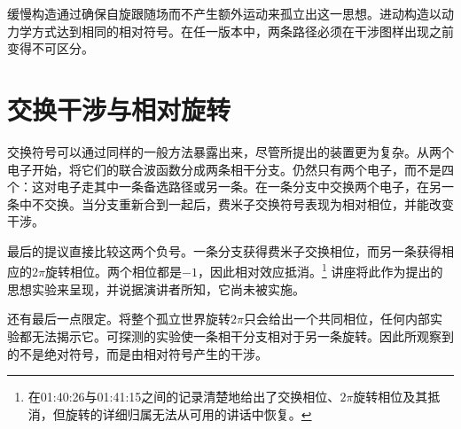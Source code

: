 \begin{classroomqa}
\end{classroomqa}

缓慢构造通过确保自旋跟随场而不产生额外运动来孤立出这一思想。进动构造以动力学方式达到相同的相对符号。在任一版本中，两条路径必须在干涉图样出现之前变得不可区分。

\begin{classroomqa}
\end{classroomqa}

\begin{classroomqa}
\end{classroomqa}

\section{交换干涉与相对旋转}

交换符号可以通过同样的一般方法暴露出来，尽管所提出的装置更为复杂。从两个电子开始，将它们的联合波函数分成两条相干分支。仍然只有两个电子，而不是四个：这对电子走其中一条备选路径或另一条。在一条分支中交换两个电子，在另一条中不交换。当分支重新合到一起后，费米子交换符号表现为相对相位，并能改变干涉。

最后的提议直接比较这两个负号。一条分支获得费米子交换相位，而另一条获得相应的\(2\pi\)旋转相位。两个相位都是\(-1\)，因此相对效应抵消。\footnote{在01:40:26与01:41:15之间的记录清楚地给出了交换相位、\(2\pi\)旋转相位及其抵消，但旋转的详细归属无法从可用的讲话中恢复。} 讲座将此作为提出的思想实验来呈现，并说据演讲者所知，它尚未被实施。

\begin{classroomqa}
\end{classroomqa}

还有最后一点限定。将整个孤立世界旋转\(2\pi\)只会给出一个共同相位，任何内部实验都无法揭示它。可探测的实验使一条相干分支相对于另一条旋转。因此所观察到的不是绝对符号，而是由相对符号产生的干涉。
